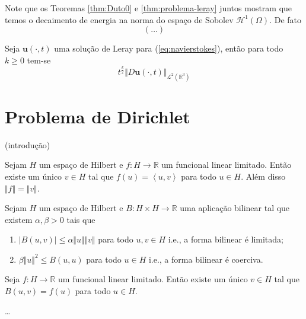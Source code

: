 \documentclass[a4paper, 11pt]{book}
\theoremstyle{definition}
\newcommand{\bR}{\mathbb{R}}
\newcommand{\bu}{\mathbf{u}}
\newcommand{\cH}{\mathcal{H}}
\newcommand{\cL}{\mathcal{L}}
\begin{document}
Note que os Teoremas \ref{thm:Duto0} e \ref{thm:problema-leray} juntos mostram que temos o decaimento de energia na norma do espaço de Sobolev $\cH^1(\Omega)$. De fato
\[
    (\dots)
\]

\begin{tbox}
    Seja $\bu(\cdot,t)$ uma solução de Leray para (\ref{eq:navierstokes}), então para todo $k \geqslant 0$ tem-se
    \[
        t^{\frac{k}{2}} \Vert D\bu(\cdot,t) \Vert_{\cL^2(\bR^3)}
    \]
\end{tbox}

\section{Problema de Dirichlet}

(introdução)

\begin{tbox}
    Sejam $H$ um espaço de Hilbert e $f : H \to \bR$ um funcional linear limitado.
    Então existe um único $v \in H$ tal que $f(u) = \left\langle u, v\right\rangle$ para todo $u \in H$.
    Além disso $\Vert f \Vert = \Vert v \Vert$.
\end{tbox}
\begin{prf}
    
\end{prf}

\begin{tbox}
    Sejam $H$ um espaço de Hilbert e $B : H \times H \to \bR$ uma aplicação bilinear tal que existem $\alpha, \beta > 0$ tais que
    \begin{enumerate}
        \item $| B(u,v)| \leqslant \alpha \Vert u \Vert \Vert v \Vert$ para todo $u,v \in H$ i.e., a forma bilinear é limitada;
        \item $\beta \Vert u \Vert^2 \leqslant B(u,u)$ para todo $u \in H$ i.e., a forma bilinear é coerciva.
    \end{enumerate}
    Seja $f : H \to \bR$ um funcional linear limitado. Então existe um único $v \in H$ tal que $B(u,v) = f(u)$ para todo $u \in H$.
\end{tbox}
\begin{prf}
    \dots
\end{prf}
\end{document}
